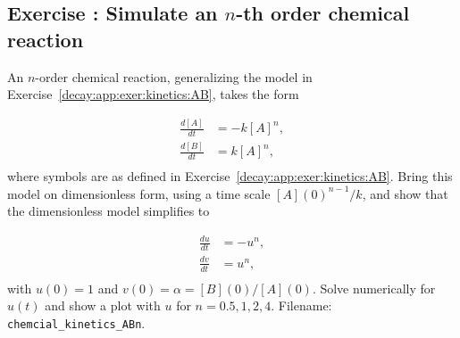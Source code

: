 \documentclass[%
oneside,                 %
final,                   %
10pt]{article}
\newenvironment{doconceexercise}{}{}
\newcounter{doconceexercisecounter}
\begin{document}
\begin{doconceexercise}

\subsection*{Exercise \thedoconceexercisecounter: Simulate an $n$-th order chemical reaction}

\label{decay:app:exer:kinetics:ABn}

An $n$-order chemical reaction, generalizing the model in
Exercise~\ref{decay:app:exer:kinetics:AB}, takes the form

\begin{align*}
\frac{d[A]}{dt} &= -k[A]^n,\\ 
\frac{d[B]}{dt} &= k[A]^n,\\ 
\end{align*}
where symbols are as defined in Exercise~\ref{decay:app:exer:kinetics:AB}.
Bring this model on dimensionless form, using a time scale $[A](0)^{n-1}/k$,
and show that the dimensionless model simplifies to

\begin{align*}
\frac{du}{dt} &= -u^n,\\ 
\frac{dv}{dt} &= u^n,\\ 
\end{align*}
with $u(0)=1$ and $v(0)=\alpha = [B](0)/[A](0)$. Solve numerically for
$u(t)$ and show a plot with $u$ for $n=0.5, 1, 2, 4$.
\noindent Filename: \Verb!chemcial_kinetics_ABn!.

\end{doconceexercise}
\end{document}

